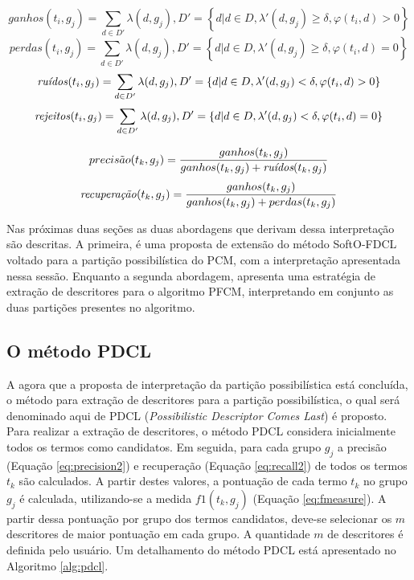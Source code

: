 \begin{equation}
  ganhos(t_i,g_j) = 
  \sum_{
      d \in D' 
  } \lambda(d,g_j), D' = \left\{d | d \in D, \lambda'(d,g_j) \geq \delta, \varphi(t_i,d) > 0
  \right\}
  \label{eq:ganhos}
\end{equation}
\begin{equation}
  perdas(t_i,g_j) = 
  \sum_{
      d \in D' 
  } \lambda(d,g_j), D' = \left\{d | d \in D, \lambda'(d,g_j) \geq \delta, \varphi(t_i,d) = 0
  \right\}
  \label{eq:perdas}
\end{equation}
\begin{equation}
  \text{\it ruídos\/}(t_i,g_j) = 
  \sum_{
      d \in D' 
  } \lambda(d,g_j), D' = \left\{d | d \in D, \lambda'(d,g_j) < \delta, \varphi(t_i,d) > 0 \right\}
  \label{eq:ruidos}
\end{equation}
\begin{equation}
  \text{\it rejeitos\/}(t_i,g_j) = 
  \sum_{
      d \in D' 
  } \lambda(d,g_j), D' = \left\{d | d \in D, \lambda'(d,g_j) < \delta, \varphi(t_i,d) = 0 \right\}
  \label{eq:rejeitos}
\end{equation}

\begin{equation}
  precis\tilde{a}o(t_k,g_j) = \frac{ganhos(t_k,g_j)}{ganhos(t_k,g_j) + \text{\it ruídos}(t_k,g_j)}
  \label{eq:precision2}
\end{equation}
\begin{equation}
  \text{\it recuperação\/}(t_k,g_j) = \frac{ganhos(t_k,g_j)}{ganhos(t_k,g_j) + perdas(t_k,g_j)}
  \label{eq:recall2}
\end{equation}

Nas próximas duas seções as duas abordagens que derivam dessa interpretação são descritas. A
primeira, é uma proposta de extensão do método SoftO-FDCL voltado para a partição possibilística do
PCM, com a interpretação apresentada nessa sessão. Enquanto a segunda abordagem, apresenta uma
estratégia de extração de descritores para o algoritmo PFCM, interpretando em conjunto as duas
partições presentes no algoritmo.

\subsection{O método PDCL}

A agora que a proposta de interpretação da partição possibilística está concluída, 
o método para extração de descritores para a partição possibilística, o qual
será denominado aqui de PDCL ({\it Possibilistic Descriptor Comes Last\/}) é proposto. Para realizar a extração
de descritores, o método PDCL considera inicialmente todos os termos como candidatos. Em seguida,
para cada grupo $g_j$ a precisão (Equação \ref{eq:precision2}) e recuperação (Equação
\ref{eq:recall2}) de todos os termos $t_k$ são calculados. A partir destes valores, a
pontuação de cada termo $t_k$ no grupo $g_j$ é calculada, utilizando-se a medida $f1(t_k,g_j)$ (Equação
\ref{eq:fmeasure}). A partir dessa pontuação por grupo dos termos candidatos, deve-se selecionar
os $m$ descritores de maior pontuação em cada grupo. A quantidade $m$ de descritores é
definida pelo usuário. Um detalhamento do método PDCL está apresentado no Algoritmo \ref{alg:pdcl}.

